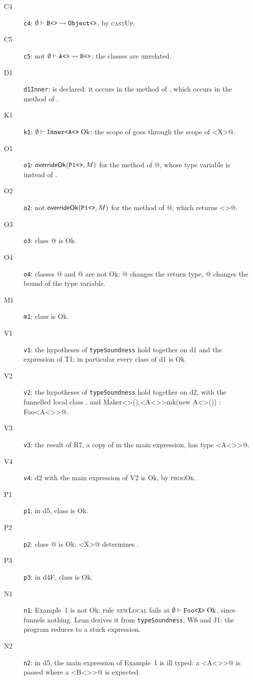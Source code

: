 \begin{description}
\item[C4] \texttt{c4}: $\emptyset\vdash \text{\ttfamily B<>} \rightsquigarrow \text{\ttfamily Object<>}$, by \textsc{castUp}.
\item[C5] \texttt{c5}: not $\emptyset\vdash \text{\ttfamily A<>} \rightsquigarrow \text{\ttfamily B<>}$: the classes are unrelated.
\item[D1] \texttt{d1Inner}: \Q@Inner@ is declared: it occurs in the method \Q@x@ of \Q@Outer@, which occurs in the method \Q@mk@ of \Q@Nest@.
\item[K1] \texttt{k1}: $\emptyset \vdash \text{\ttfamily Inner<A<>>}\mskip5mu\mathrm{Ok}$: the scope of \Q@Inner@ goes through the scope of \Q@Outer<X>@.
\item[O1] \texttt{o1}: $\mathsf{overrideOk}(\text{\ttfamily P1<>},M)$ for the method \Q@id@ of @, whose type variable is \Q@Z@ instead of \Q@X@.
\item[O2] \texttt{o2}: not $\mathsf{overrideOk}(\text{\ttfamily P1<>},M)$ for the method \Q@id@ of @, which returns \Q@Object<>@.
\item[O3] \texttt{o3}: class @ is Ok.
\item[O4] \texttt{o4}: classes @ and @ are not Ok: @ changes the return type, @ changes the bound of the type variable.
\item[M1] \texttt{m1}: class \Q@Maker@ is Ok.
\item[V1] \texttt{v1}: the hypotheses of \texttt{typeSoundness} hold together on d1 and the expression of T1; in particular every class of d1 is Ok.
\item[V2] \texttt{v2}: the hypotheses of \texttt{typeSoundness} hold together on d2, with the funnelled local class \Q@MyFoo@, and \Q@new Maker<>().<A<>>mk(new A<>()) : Foo<A<>>@.
\item[V3] \texttt{v3}: the result of R7, a copy of \Q@MyFoo@ in the main expression, has type \Q@Foo<A<>>@.
\item[V4] \texttt{v4}: d2 with the main expression of V2 is Ok, by \textsc{progOk}.
\item[P1] \texttt{p1}: in d5, class \Q@Broken@ is Ok.
\item[P2] \texttt{p2}: class @ is Ok: \Q@Holder<X>@ determines \Q@X@.
\item[P3] \texttt{p3}: in d4F, class \Q@Broken@ is Ok.
\item[N1] \texttt{n1}: Example~1 is not Ok: rule \textsc{newLocal} fails at $\emptyset \vdash \text{\ttfamily Foo<X>}\mskip5mu\mathrm{Ok}$, since \Q@MyFoo@ funnels nothing.
Lean derives it from \texttt{typeSoundness}, W6 and J1: the program reduces to a stuck expression.
\item[N2] \texttt{n2}: in d5, the main expression of Example~1 is ill typed: a \Q@Foo<A<>>@ is passed where a \Q@Foo<B<>>@ is expected.

\end{description}
